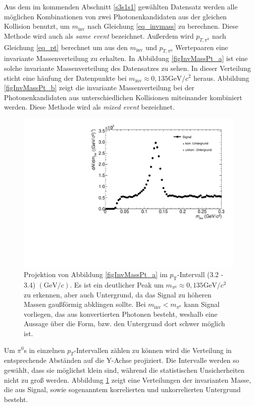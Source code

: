 \newline
Aus dem im kommenden Abschnitt \ref{s3s1s1} gew\"ahlten Datensatz werden alle m{\"o}glichen Kombinationen von zwei Photonenkandidaten aus der gleichen Kollision benutzt, um $m_{\text{inv}}$ nach Gleichung \ref{eq_invmass} zu berechnen.
Diese Methode wird auch als {\it same event} bezeichnet.
Au{\ss}erdem wird $p_{T,\pi^{0}}$ nach Gleichung \ref{eq_pt} berechnet um aus den $m_{\text{inv}}$ und $p_{T,\pi^{0}}$ Wertepaaren eine invariante Massenverteilung zu erhalten.
In Abbildung \ref{figInvMassPt_a} ist eine solche invariante Massenverteilung des Datensatzes zu sehen.
In dieser Verteilung sticht eine h{\"a}ufung der Datenpunkte bei $m_{\text{inv}}\approx 0,135\text{GeV/}c^{2}$ heraus.
Abbildung \ref{figInvMassPt_b} zeigt die invariante Massenverteilung bei der Photonenkandidaten aus unterschiedlichen Kollisionen miteinander kombiniert werden.
Diese Methode wird als {\it mixed event} bezeichnet.
\begin{figure}[tbp]
\centering
\includegraphics[width=.6\linewidth]{hSignalPlusBkg.pdf}
\caption{Projektion von Abbildung \ref{figInvMassPt_a} im $p_{\text{T}}$-Intervall (3.2 - 3.4) $(\text{GeV/}c)$. Es ist ein deutlicher Peak um $m_{\pi^{0}} \approx 0,135\text{GeV/}c^{2}$ zu erkennen, aber auch Untergrund, da das Signal zu h{\"o}heren Massen gau{\ss}f{\"o}rmig abklingen sollte. Bei $m_{\text{inv}} < m_{\pi^{0}}$ kann Signal vorliegen, das aus konvertierten Photonen besteht, weshalb eine Aussage {\"u}ber die Form, bzw. den Untergrund dort schwer m{\"o}glich ist.}
\label{figSignalPlusBkg}
\end{figure}
\newline
Um $\pi^{0}$s in einzelnen $p_{T}$-Intervallen z{\"a}hlen zu k{\"o}nnen wird die Verteilung in entsprechende Abst{\"a}nden auf die Y-Achse projiziert.
Die Intervalle werden so gew{\"a}hlt, dass sie m{\"o}glichst klein sind, w{\"a}hrend die statistischen Unsicherheiten nicht zu gro{\ss} werden.
Abbildung \ref{figSignalPlusBkg} zeigt eine Verteilungen der invarianten Masse, die aus Signal, sowie sogenanntem korrelierten und unkorrelierten Untergrund besteht.
